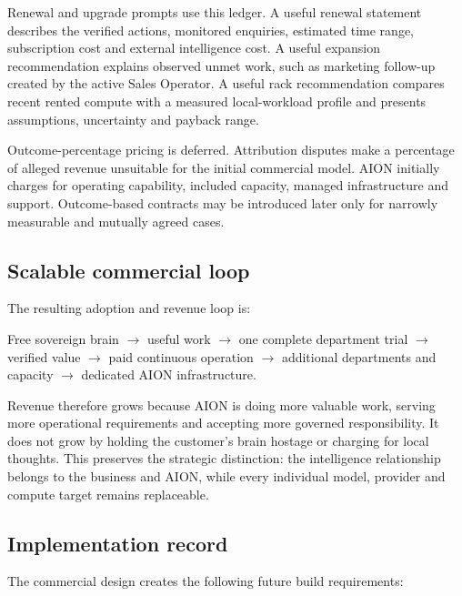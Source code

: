 Renewal and upgrade prompts use this ledger. A useful renewal statement describes the verified
actions, monitored enquiries, estimated time range, subscription cost and external intelligence
cost. A useful expansion recommendation explains observed unmet work, such as marketing follow-up
created by the active Sales Operator. A useful rack recommendation compares recent rented compute
with a measured local-workload profile and presents assumptions, uncertainty and payback range.

Outcome-percentage pricing is deferred. Attribution disputes make a percentage of alleged revenue
unsuitable for the initial commercial model. AION initially charges for operating capability,
included capacity, managed infrastructure and support. Outcome-based contracts may be introduced
later only for narrowly measurable and mutually agreed cases.

\subsection{Scalable commercial loop}

The resulting adoption and revenue loop is:

\begin{center}
Free sovereign brain $\rightarrow$ useful work $\rightarrow$ one complete department trial
$\rightarrow$ verified value $\rightarrow$ paid continuous operation $\rightarrow$ additional
departments and capacity $\rightarrow$ dedicated AION infrastructure.
\end{center}

Revenue therefore grows because AION is doing more valuable work, serving more operational
requirements and accepting more governed responsibility. It does not grow by holding the
customer's brain hostage or charging for local thoughts. This preserves the strategic distinction:
the intelligence relationship belongs to the business and AION, while every individual model,
provider and compute target remains replaceable.

\subsection{Implementation record}

The commercial design creates the following future build requirements:

